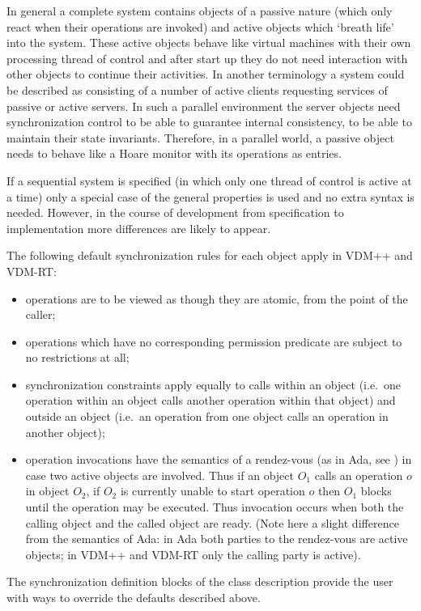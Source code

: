 \documentclass{overturerepchap}
\begin{document}
{In general a complete system contains objects of a passive
nature (which only react when their operations are invoked) and active
objects which `breath life' into the system. These active objects
behave like virtual machines with their own processing thread of
control and after start up they do not need interaction with other
objects to continue their activities.
In another terminology a system could be described as
consisting of a number of active clients requesting services of passive
or active servers.
In such a parallel environment the server objects need
synchronization control to be able to guarantee internal consistency,
to be able to maintain their state invariants.
Therefore, in a parallel world, a passive object needs to
behave like a Hoare monitor with its operations as entries.

If a sequential system is specified (in which only one thread of control
is active at a time) only a special case of the general properties is used
and no extra syntax is needed. However, in the course of development from
specification to implementation more differences are likely to appear.

The following default synchronization rules for each object apply in
VDM++ and VDM-RT:
\begin{itemize}
\item operations are to be viewed as though they are atomic, from the
point of the caller;
\item operations which have no corresponding permission predicate are
  subject to no restrictions at all;
\item synchronization constraints apply equally to calls within an
  object (i.e.\ one operation within an object calls another operation
  within that object) and outside an object (i.e.\ an operation from
  one object calls an operation in another object);
\item operation invocations have the semantics of a rendez-vous (as in
Ada, see \cite{adalrm}) in case two active objects are involved. Thus if an
object $O_1$ calls an operation $o$ in object $O_2$, if $O_2$ is currently
unable to start operation $o$ then $O_1$ blocks until the operation may be
executed. Thus invocation occurs when both the calling object and the
called object are ready. (Note here a slight difference from the
semantics of Ada: in Ada both parties to the rendez-vous are active
objects; in VDM++ and VDM-RT only the calling party is active).
\end{itemize}
The synchronization definition blocks of the class description provide the
user with ways to override the defaults described above.

}
\end{document}
